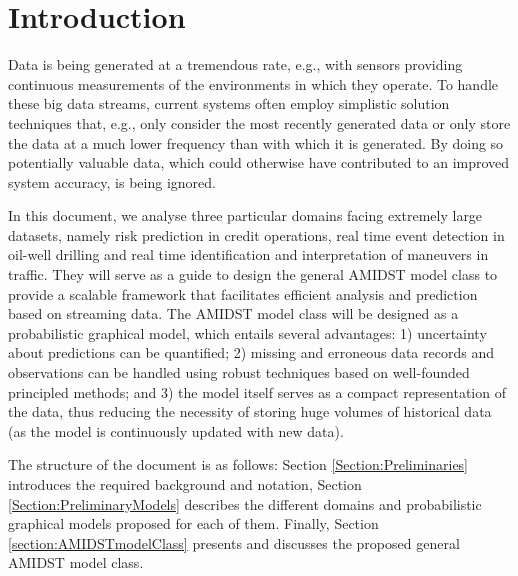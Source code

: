 \section{Introduction}

Data is being generated at a tremendous rate, e.g., with sensors providing continuous measurements of the environments in which they operate. To handle these big data streams, current systems often employ simplistic solution techniques that, e.g., only consider the most recently generated data or only store the data at a much lower frequency than with which it is generated. By doing so potentially valuable data, which could otherwise have contributed to an improved system accuracy, is being ignored. 

In this document, we analyse three particular domains facing extremely large datasets, namely risk prediction in credit operations, real time event detection in oil-well drilling and real time identification and interpretation of maneuvers in traffic. They will serve as a guide to design the general AMIDST model class to provide a scalable framework that facilitates efficient analysis and prediction based on streaming data. The AMIDST model class will be designed as a probabilistic graphical model, which entails several advantages: 1) uncertainty about predictions can be quantified; 2) missing and erroneous data records and observations can be handled using robust techniques based on well-founded principled methods; and 3) the model itself serves as a compact representation of the data, thus reducing the necessity of storing huge volumes of historical data (as the model is continuously updated with new data).

The structure of the document is as follows: Section \ref{Section:Preliminaries} introduces the required background and notation, Section \ref{Section:PreliminaryModels} describes the different domains and probabilistic graphical models proposed for each of them. Finally, Section \ref{section:AMIDSTmodelClass} presents and discusses the proposed general AMIDST model class.